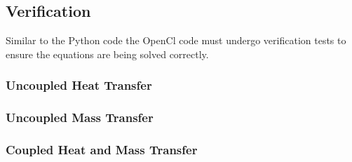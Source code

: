 \documentclass[../Interim_Report_Master]{subfiles}
\begin{document}
\subsection{Verification}
Similar to the Python code the OpenCl code must undergo verification tests to ensure the equations are being solved correctly.

\subsubsection{Uncoupled Heat Transfer}

\subsubsection{Uncoupled Mass Transfer}

\subsubsection{Coupled Heat and Mass Transfer}
\end{document}
